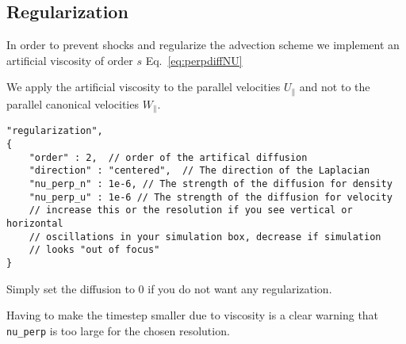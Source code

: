 \subsection{Regularization} \label{sec:regularization}
In order to prevent shocks and regularize the advection scheme
we implement an artificial viscosity of order $s$ Eq.~\eqref{eq:perpdiffNU}
\begin{tcolorbox}[title=Note]
    We apply the artificial viscosity to the parallel velocities $U_\parallel$ and
    not to the parallel canonical velocities $W_\parallel$.
\end{tcolorbox}
\begin{verbatim}
"regularization",
{
    "order" : 2,  // order of the artifical diffusion
    "direction" : "centered",  // The direction of the Laplacian
    "nu_perp_n" : 1e-6, // The strength of the diffusion for density
    "nu_perp_u" : 1e-6 // The strength of the diffusion for velocity
    // increase this or the resolution if you see vertical or horizontal
    // oscillations in your simulation box, decrease if simulation
    // looks "out of focus"
}
\end{verbatim}
Simply set the diffusion to 0 if you do not want any regularization.
\begin{tcolorbox}[title=Note]
    Having to make the timestep smaller due to viscosity
    is a clear warning that \texttt{nu_perp} is too large for the chosen resolution.
\end{tcolorbox}

